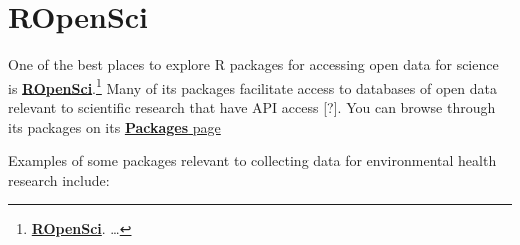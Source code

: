 \documentclass[]{tufte-book}
\begin{document}
\hypertarget{ropensci}{%
\section{ROpenSci}\label{ropensci}}

One of the best places to explore R packages for accessing open data for science is
\href{https://ropensci.org/}{\textbf{ROpenSci}}.\footnote{\href{https://ropensci.org/}{\textbf{ROpenSci}}. \ldots{}}
Many of its packages facilitate access to databases of open data relevant to scientific
research that have API access {[}?{]}. You can browse through its packages on
its \href{https://ropensci.org/packages/}{\textbf{Packages} page}

Examples of some packages relevant to collecting data for environmental health research
include:
\end{document}
